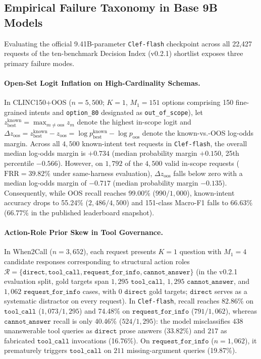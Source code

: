 \documentclass[10pt,twocolumn]{article}
\begin{document}
\subsection{Empirical Failure Taxonomy in Base 9B Models}
Evaluating the official 9.41B-parameter \texttt{Clef-flash} checkpoint across all 22,427 requests of the ten-benchmark Decision Index (v0.2.1) shortlist exposes three primary failure modes.

\paragraph{Open-Set Logit Inflation on High-Cardinality Schemas.}
In CLINC150+OOS ($n = 5{,}500$; $K = 1$, $M_1 = 151$ options comprising 150 fine-grained intents and \texttt{option\_80} designated as \texttt{out\_of\_scope}), let $z_{\text{best}}^{\text{known}} = \max_{m \ne \text{oos}} z_m$ denote the highest in-scope logit and $\Delta z_{\text{oos}} = z_{\text{best}}^{\text{known}} - z_{\text{oos}} = \log p_{\text{best}}^{\text{known}} - \log p_{\text{oos}}$ denote the known-vs.-OOS log-odds margin. Across all $4{,}500$ known-intent test requests in \texttt{Clef-flash}, the overall median log-odds margin is $+0.734$ (median probability margin $+0.150$, 25th percentile $-0.566$). However, on $1{,}792$ of the $4{,}500$ valid in-scope requests ($\text{FRR} = 39.82\%$ under same-harness evaluation), $\Delta z_{\text{oos}}$ falls below zero with a median log-odds margin of $-0.717$ (median probability margin $-0.135$). Consequently, while OOS recall reaches 99.00\% ($990/1{,}000$), known-intent accuracy drops to 55.24\% ($2{,}486/4{,}500$) and 151-class Macro-F1 falls to 66.63\% (66.77\% in the published leaderboard snapshot).

\paragraph{Action-Role Prior Skew in Tool Governance.}
In When2Call ($n = 3{,}652$), each request presents $K = 1$ question with $M_1 = 4$ candidate responses corresponding to structural action roles $\mathcal{R} = \{\texttt{direct},\allowbreak \texttt{tool\_call},\allowbreak \texttt{request\_for\_info},\allowbreak \texttt{cannot\_answer}\}$ (in the v0.2.1 evaluation split, gold targets span $1{,}295$ $\texttt{tool\_call}$, $1{,}295$ $\texttt{cannot\_answer}$, and $1{,}062$ $\texttt{request\_for\_info}$ cases, with $0$ $\texttt{direct}$ gold targets; $\texttt{direct}$ serves as a systematic distractor on every request). In \texttt{Clef-flash}, recall reaches 82.86\% on $\texttt{tool\_call}$ ($1{,}073/1{,}295$) and 74.48\% on $\texttt{request\_for\_info}$ ($791/1{,}062$), whereas $\texttt{cannot\_answer}$ recall is only 40.46\% ($524/1{,}295$): the model misclassifies $438$ unanswerable tool queries as $\texttt{direct}$ prose answers (33.82\%) and $217$ as fabricated $\texttt{tool\_call}$ invocations (16.76\%). On $\texttt{request\_for\_info}$ ($n = 1{,}062$), it prematurely triggers $\texttt{tool\_call}$ on $211$ missing-argument queries (19.87\%).
\end{document}
